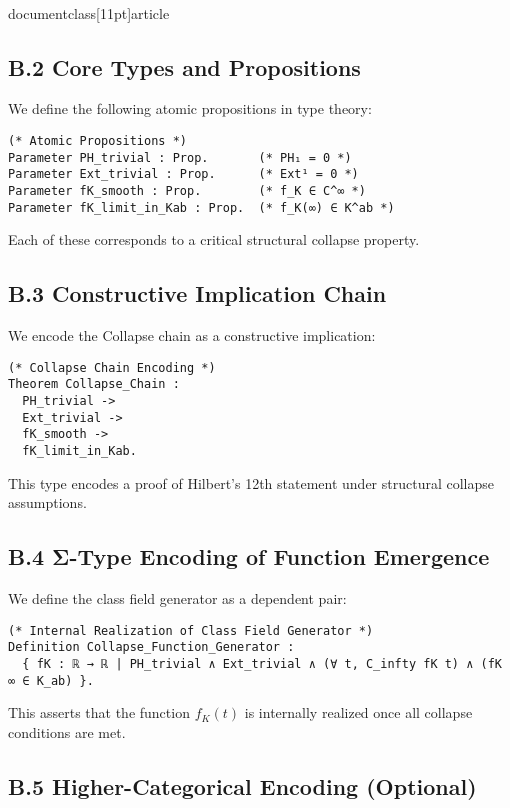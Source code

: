 \\documentclass[11pt]{article}
\begin{document}
\subsection*{B.2 Core Types and Propositions}

We define the following atomic propositions in type theory:

\begin{lstlisting}[language=Coq, caption=Atomic Collapse Propositions]
(* Atomic Propositions *)
Parameter PH_trivial : Prop.       (* PH₁ = 0 *)
Parameter Ext_trivial : Prop.      (* Ext¹ = 0 *)
Parameter fK_smooth : Prop.        (* f_K ∈ C^∞ *)
Parameter fK_limit_in_Kab : Prop.  (* f_K(∞) ∈ K^ab *)
\end{lstlisting}

Each of these corresponds to a critical structural collapse property.

\subsection*{B.3 Constructive Implication Chain}

We encode the Collapse chain as a constructive implication:

\begin{lstlisting}[language=Coq, caption=Collapse Chain Encoding]
(* Collapse Chain Encoding *)
Theorem Collapse_Chain :
  PH_trivial ->
  Ext_trivial ->
  fK_smooth ->
  fK_limit_in_Kab.
\end{lstlisting}

This type encodes a proof of Hilbert’s 12th statement under structural collapse assumptions.

\subsection*{B.4 Σ-Type Encoding of Function Emergence}

We define the class field generator as a dependent pair:

\begin{lstlisting}[language=Coq, caption=Dependent Σ-Type Realization]
(* Internal Realization of Class Field Generator *)
Definition Collapse_Function_Generator : 
  { fK : ℝ → ℝ | PH_trivial ∧ Ext_trivial ∧ (∀ t, C_infty fK t) ∧ (fK ∞ ∈ K_ab) }.
\end{lstlisting}

This asserts that the function \( f_K(t) \) is internally realized once all collapse conditions are met.

\subsection*{B.5 Higher-Categorical Encoding (Optional)}
\end{document}
